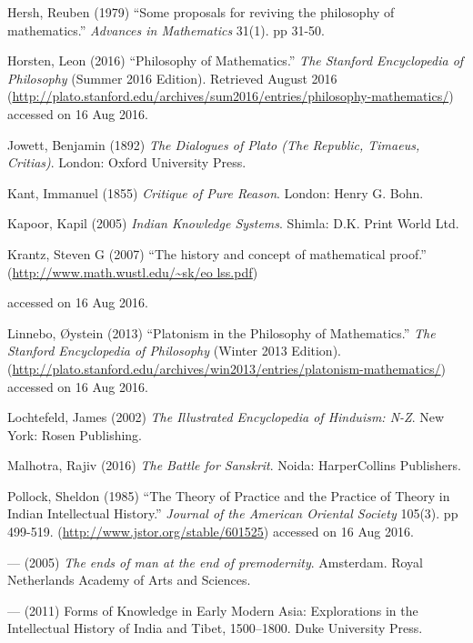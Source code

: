 \begin{thebibliography}{99}
Hersh, Reuben (1979) ``Some proposals for reviving the philosophy of mathematics.'' {\sl Advances in Mathematics} 31(1). pp 31-50.

Horsten, Leon (2016) ``Philosophy of Mathematics.'' {\sl The Stanford Encyclopedia of Philosophy} (Summer 2016 Edition). Retrieved August 2016 (\url{http://plato.stanford.edu/archives/sum2016/entries/philosophy-mathematics/}) accessed on 16 Aug 2016.

Jowett, Benjamin (1892) {\sl The Dialogues of Plato (The Republic, Timaeus, Critias)}. London: Oxford University Press.

Kant, Immanuel (1855) {\sl Critique of Pure Reason}. London: Henry G. Bohn. 

Kapoor, Kapil (2005) {\sl Indian Knowledge Systems}. Shimla: D.K. Print World Ltd.

Krantz, Steven G (2007) ``The history and concept of mathematical proof.'' 
(\url{http://www.math.wustl.edu/~sk/eo lss.pdf})

accessed on 16 Aug 2016.

Linnebo, Øystein (2013) ``Platonism in the Philosophy of Mathematics.'' {\sl The Stanford Encyclopedia of Philosophy} (Winter 2013 Edition). (\url{http://plato.stanford.edu/archives/win2013/entries/platonism-mathematics/}) accessed on 16 Aug 2016.

Lochtefeld, James (2002) {\sl The Illustrated Encyclopedia of Hinduism: N-Z}. New York: Rosen Publishing.

Malhotra, Rajiv (2016) {\sl The Battle for Sanskrit}. Noida: HarperCollins Publishers.

Pollock, Sheldon (1985) ``The Theory of Practice and the Practice of Theory in Indian Intellectual History.'' {\sl Journal of the American Oriental Society} 105(3). pp 499-519. (\url{http://www.jstor.org/stable/601525}) accessed on 16 Aug 2016.

--- (2005) {\sl The ends of man at the end of premodernity}. Amsterdam. Royal Netherlands Academy of Arts and Sciences.

--- (2011) Forms of Knowledge in Early Modern Asia: Explorations in the Intellectual History of India and Tibet, 1500--1800. Duke University Press.


\end{thebibliography}
